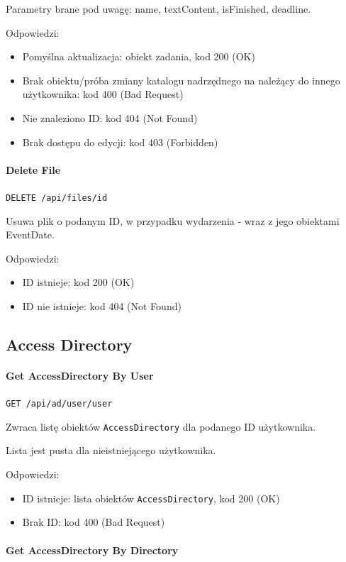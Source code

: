 \documentclass[a4paper,twoside,12pt]{book}
\begin{document}
Parametry brane pod uwagę: name, textContent, isFinished, deadline.

Odpowiedzi: 
\begin{itemize}
	\item Pomyślna aktualizacja: obiekt zadania, kod 200 (OK) 
	\item Brak obiektu/próba zmiany katalogu nadrzędnego na należący do innego użytkownika: kod 400 (Bad Request) 
	\item Nie znaleziono ID: kod 404 (Not Found)
	\item Brak dostępu do edycji: kod 403 (Forbidden)
\end{itemize}

\paragraph{Delete File}

\texttt{DELETE /api/files/{id}}

Usuwa plik o podanym ID, w przypadku wydarzenia - wraz z jego obiektami EventDate.

Odpowiedzi: 
\begin{itemize}
	\item ID istnieje: kod 200 (OK) 
	\item ID nie istnieje: kod 404 (Not Found)
\end{itemize}

\subsection{Access Directory}

\paragraph{Get AccessDirectory By User}

\texttt{GET /api/ad/user/{user}}

Zwraca listę obiektów \texttt{AccessDirectory} dla podanego ID użytkownika.

Lista jest pusta dla nieistniejącego użytkownika.

Odpowiedzi: 
\begin{itemize}
	\item ID istnieje: lista obiektów \texttt{AccessDirectory}, kod 200 (OK)
	\item Brak ID: kod 400 (Bad Request)
\end{itemize}

\paragraph{Get AccessDirectory By Directory}
\end{document}
